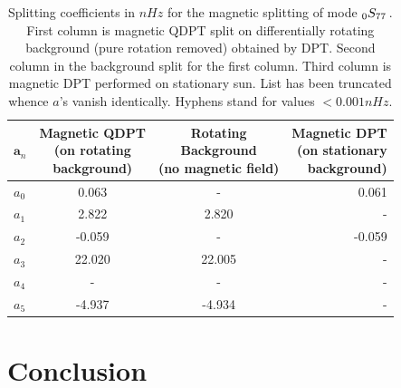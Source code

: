 \begin{table}
\begin{center}
\begin{tabular}{|l|c|c|r|}
\hline
\textbf{$\bm{a}_n$} & \shortstack{\textbf{Magnetic QDPT} \\ \textbf{(on rotating} \\ \textbf{ background)}} & \shortstack{\textbf{Rotating} \\ \textbf{ Background} \\ \textbf{(no magnetic field)}} & \shortstack{\textbf{Magnetic DPT} \\ \textbf{(on stationary} \\ \textbf{ background)}} \\ \hline
$a_{0}$ & \hfill  0.063 & \hfill - & \hfill  0.061 \\ \hline
$a_{1}$ & \hfill  2.822 & \hfill  2.820 &\hfill  - \\ \hline
$a_{2}$ & \hfill -0.059 & \hfill - & \hfill -0.059 \\ \hline
$a_{3}$ & \hfill 22.020 & \hfill 22.005 & \hfill  - \\ \hline
$a_{4}$ & \hfill -  &\hfill  -&\hfill - \\ \hline
$a_{5}$ & \hfill -4.937 &\hfill -4.934 &\hfill  - \\ \hline
\end{tabular}
\end{center}
\caption{Splitting coefficients in $nHz$ for the magnetic splitting of mode $_{0}S_{77}\,$. First column is magnetic QDPT split on differentially rotating background (pure rotation removed) obtained by DPT. Second column in the background split for the first column. Third column is magnetic DPT performed on stationary sun. List has been truncated whence $a$'s vanish identically. Hyphens stand for values $< 0.001nHz$.}
\label{tab:mag_split}
\end{table}

\section{Conclusion}

